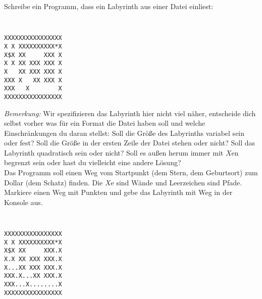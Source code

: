 \begin{aufg}
Schreibe ein Programm, dass ein Labyrinth aus einer Datei einliest:
{\tt
\lstset{language=Delphi}
\begin{lstlisting}
XXXXXXXXXXXXXXXX
X X XXXXXXXXXX*X
X$X XX     XXX X
X X XX XXX XXX X
X   XX XXX XXX X
XXX X   XX XXX X
XXX   X        X
XXXXXXXXXXXXXXXX
\end{lstlisting}
}
\emph{Bemerkung: } Wir spezifizieren das Labyrinth hier nicht viel näher, entscheide dich selbst vorher was für ein Format die Datei haben soll und welche Einschränkungen du daran stellst: Soll die Größe des Labyrinths variabel sein oder fest? Soll die Größe in der ersten Zeile der Datei stehen oder nicht? Soll das Labyrinth quadratisch sein oder nicht? Soll es außen herum immer mit $X$en begrenzt sein oder hast du vielleicht eine andere Lösung?\\
Das Programm soll einen Weg vom Startpunkt (dem Stern, dem Geburtsort) zum Dollar (dem Schatz) finden. Die $X$e sind Wände und Leerzeichen sind Pfade. Markiere einen Weg mit Punkten und gebe das Labyrinth mit Weg in der Konsole aus.

{\tt
\lstset{language=Delphi}
\begin{lstlisting}
XXXXXXXXXXXXXXXX
X X XXXXXXXXXX*X
X$X XX     XXX.X
X.X XX XXX XXX.X
X...XX XXX XXX.X
XXX.X...XX XXX.X
XXX...X........X
XXXXXXXXXXXXXXXX
\end{lstlisting}
}

\end{aufg}